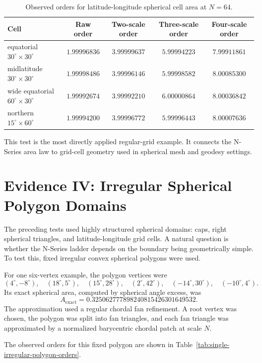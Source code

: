 \documentclass[11pt]{article}
\begin{document}
\begin{table}[ht]
\centering
\small
\begin{tabular}{lcccc}
\toprule
Cell & Raw order & Two-scale order & Three-scale order & Four-scale order \\
\midrule
equatorial $30^\circ\times30^\circ$ & $1.99996836$ & $3.99999637$ & $5.99994223$ & $7.99911861$ \\
midlatitude $30^\circ\times30^\circ$ & $1.99998486$ & $3.99996146$ & $5.99998582$ & $8.00085300$ \\
wide equatorial $60^\circ\times30^\circ$ & $1.99992674$ & $3.99992210$ & $6.00000864$ & $8.00036842$ \\
northern $15^\circ\times60^\circ$ & $1.99994200$ & $3.99996772$ & $5.99996443$ & $8.00007636$ \\
\bottomrule
\end{tabular}
\caption{Observed orders for latitude-longitude spherical cell area at $N=64$.}
\label{tab:latlon-orders}
\end{table}

This test is the most directly applied regular-grid example.  It connects
the N-Series area law to grid-cell geometry used in spherical mesh and
geodesy settings.

\section{Evidence IV: Irregular Spherical Polygon Domains}

The preceding tests used highly structured spherical domains: caps, right
spherical triangles, and latitude-longitude grid cells.  A natural question
is whether the N-Series ladder depends on the boundary being geometrically
simple.  To test this, fixed irregular convex spherical polygons were used.

For one six-vertex example, the polygon vertices were
\[
  (4^\circ,-8^\circ),\quad
  (18^\circ,5^\circ),\quad
  (15^\circ,28^\circ),\quad
  (2^\circ,42^\circ),\quad
  (-14^\circ,30^\circ),\quad
  (-10^\circ,4^\circ).
\]
Its exact spherical area, computed by spherical angle excess, was
\[
  A_{\mathrm{exact}}
  =
  0.325062777898240815426301649532.
\]
The approximation used a regular chordal fan refinement.  A root vertex was
chosen, the polygon was split into fan triangles, and each fan triangle was
approximated by a normalized barycentric chordal patch at scale $N$.

The observed orders for this fixed polygon are shown in
Table~\ref{tab:single-irregular-polygon-orders}.
\end{document}

